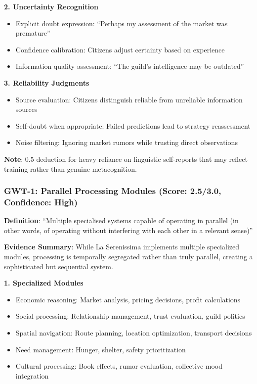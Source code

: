 \documentclass[12pt,a4paper]{article}
\begin{document}
\textbf{2. Uncertainty Recognition}
\begin{itemize}
    \item Explicit doubt expression: ``Perhaps my assessment of the market was premature''
    \item Confidence calibration: Citizens adjust certainty based on experience
    \item Information quality assessment: ``The guild's intelligence may be outdated''
\end{itemize}

\textbf{3. Reliability Judgments}
\begin{itemize}
    \item Source evaluation: Citizens distinguish reliable from unreliable information sources
    \item Self-doubt when appropriate: Failed predictions lead to strategy reassessment
    \item Noise filtering: Ignoring market rumors while trusting direct observations
\end{itemize}

\textbf{Note}: 0.5 deduction for heavy reliance on linguistic self-reports that may reflect training rather than genuine metacognition.

\subsubsection{GWT-1: Parallel Processing Modules (Score: 2.5/3.0, Confidence: High)}

\textbf{Definition}: ``Multiple specialised systems capable of operating in parallel (in other words, of operating without interfering with each other in a relevant sense)''

\textbf{Evidence Summary}: While La Serenissima implements multiple specialized modules, processing is temporally segregated rather than truly parallel, creating a sophisticated but sequential system.

\textbf{1. Specialized Modules}
\begin{itemize}
    \item Economic reasoning: Market analysis, pricing decisions, profit calculations
    \item Social processing: Relationship management, trust evaluation, guild politics
    \item Spatial navigation: Route planning, location optimization, transport decisions
    \item Need management: Hunger, shelter, safety prioritization
    \item Cultural processing: Book effects, rumor evaluation, collective mood integration
\end{itemize}
\end{document}
